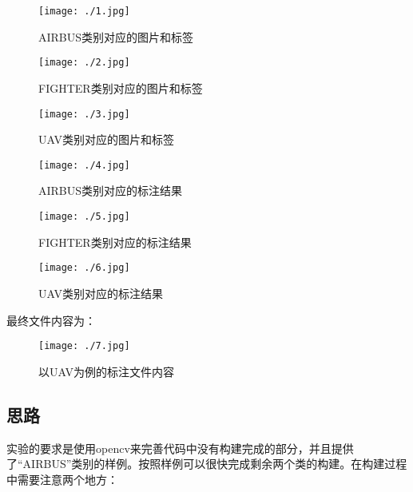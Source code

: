 \documentclass{article}
\begin{document}
    		
		    \begin{figure}[h]
	   			\begin{minipage}[h]{0.3\linewidth}
	   				\centering
	   				\texttt{[image: ./1.jpg]}
	   				\caption{AIRBUS类别对应的图片和标签}
	   			\end{minipage}
	   			\begin{minipage}[h]{0.3\linewidth}
	   				\centering
	   				\texttt{[image: ./2.jpg]}
	   				\caption{FIGHTER类别对应的图片和标签}
	   			\end{minipage}
   			   	\begin{minipage}[h]{0.3\linewidth}
		   			\centering
		   			\texttt{[image: ./3.jpg]}
		   			\caption{UAV类别对应的图片和标签}
		   		\end{minipage}   		
    		\end{figure}
    	
    	
    		\begin{figure}[h]
    			\begin{minipage}[h]{0.3\linewidth}
    				\centering
    				\texttt{[image: ./4.jpg]}
    				\caption{AIRBUS类别对应的标注结果}
    			\end{minipage}
    			\begin{minipage}[h]{0.3\linewidth}
    				\centering
    				\texttt{[image: ./5.jpg]}
    				\caption{FIGHTER类别对应的标注结果}
    			\end{minipage}
    			\begin{minipage}[h]{0.3\linewidth}
    				\centering
    				\texttt{[image: ./6.jpg]}
    				\caption{UAV类别对应的标注结果}
    			\end{minipage}   		
    		\end{figure}
    	
    	最终文件内容为：
    	
    	\begin{figure}[h]
    		\centering
    		\texttt{[image: ./7.jpg]}
    		\caption{以UAV为例的标注文件内容} \label{fig:aa}
    	\end{figure}
    	
    	\subsection{思路}
    	
    	实验的要求是使用opencv来完善代码中没有构建完成的部分，并且提供了“AIRBUS”类别的样例。按照样例可以很快完成剩余两个类的构建。在构建过程中需要注意两个地方：
    	
\end{document}

